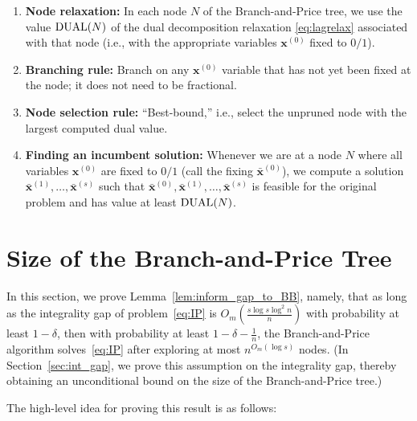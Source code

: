 \documentclass{article}
\newcommand{\xv}[0]{\mathbf{x}}
\newcommand{\LAG}{\textup{DUAL}}
\begin{document}
\begin{enumerate}
    \item \textbf{Node relaxation:} In each node $N$ of the Branch-and-Price tree, we use the value $\LAG(N)$ of the dual decomposition relaxation \eqref{eq:lagrelax} associated with that node (i.e., with the appropriate variables $\xv^{(0)}$ fixed to $0/1$).

    \item \textbf{Branching rule:} Branch on any $\xv^{(0)}$ variable that has not yet been fixed at the node; it does not need to be fractional.

    \item \textbf{Node selection rule:} ``Best-bound,'' i.e., select the unpruned node with the largest computed dual value.

    \item \textbf{Finding an incumbent solution:} Whenever we are at a node $N$ where all variables $\xv^{(0)}$ are fixed to $0/1$ (call the fixing $\bar{\xv}^{(0)}$), we compute a solution $\bar{\xv}^{(1)},\ldots,\bar{\xv}^{(s)}$ such that $\bar{\xv}^{(0)}, \bar{\xv}^{(1)},\ldots,\bar{\xv}^{(s)}$ is feasible for the original problem and has value at least $\LAG(N)$.
\end{enumerate}

\section{Size of the Branch-and-Price Tree}
\label{sec:number_node}
In this section, we prove Lemma~\ref{lem:inform_gap_to_BB}, namely, that as long as the integrality gap of problem~\eqref{eq:IP} is 
$O_m\!\left( \frac{s \log s \log^2 n}{n} \right)$ with probability at least $1-\delta$, then with probability at least $1 - \delta - \frac{1}{n}$, the Branch-and-Price algorithm solves~\eqref{eq:IP} after exploring at most $n^{O_m(\log s)}$ nodes. (In Section~\ref{sec:int_gap}, we prove this assumption on the integrality gap, thereby obtaining an unconditional bound on the size of the Branch-and-Price tree.)

The high-level idea for proving this result is as follows:
\end{document}
